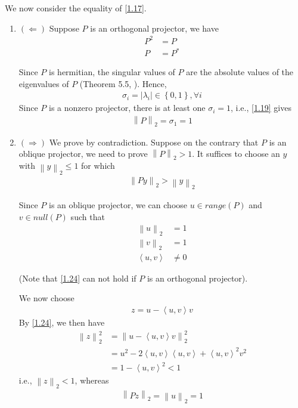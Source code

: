 \documentclass[a4paper,oneside]{book}
\numberwithin{equation}{chapter}
\begin{document}
We now consider the equality of \eqref{1.17}.
\begin{enumerate}
\item $\left(  \Leftarrow  \right)$ Suppose $P$ is an orthogonal projector, we have 
\begin{align}
{P^2} &= P\\
P &= {P^*}
\end{align}

Since $P$ is hermitian, the singular values of $P$ are the absolute values of the eigenvalues of $P$ (Theorem 5.5, \cite{1}). Hence, 
\begin{align}
\label{1.19}
{\sigma _i} = \left| {{\lambda _i}} \right| \in \left\{ {0,1} \right\},\forall i
\end{align}
Since $P$ is a nonzero projector, there is at least one $\sigma _i =1$, i.e., \eqref{1.19} gives
\begin{align}
{\left\| P \right\|_2} = {\sigma _1} = 1
\end{align}
\item $\left(  \Rightarrow  \right)$ We prove by contradiction. Suppose on the contrary that $P$ is an oblique projector, we need to prove ${\left\| P \right\|_2} > 1$. It suffices to choose an $y$ with ${\left\| y \right\|_2} \le 1$ for which 
\begin{align}
{\left\| {Py} \right\|_2} > {\left\| y \right\|_2}
\end{align}

Since $P$ is an oblique projector, we can choose $u \in range\left( P \right)$ and $v \in null\left( P \right)$ such that 
\begin{align}
{\left\| u \right\|_2} &= 1\\
{\left\| v \right\|_2} &= 1\\
\left\langle {u,v} \right\rangle  &\ne 0 \label{1.24}
\end{align}

(Note that \eqref{1.24} can not hold if $P$ is an orthogonal projector).

We now choose 
\begin{align}
z = u - \left\langle {u,v} \right\rangle v
\end{align}
By \eqref{1.24}, we then have
\begin{align}
\left\| z \right\|_2^2 &= \left\| {u - \left\langle {u,v} \right\rangle v} \right\|_2^2\\
 &= {u^2} - 2\left\langle {u,v} \right\rangle \left\langle {u,v} \right\rangle  + {\left\langle {u,v} \right\rangle ^2}{v^2}\\
& = 1 - {\left\langle {u,v} \right\rangle ^2} < 1
\end{align}
i.e., ${\left\| z \right\|_2} < 1$, whereas
\begin{align}
{\left\| {Pz} \right\|_2} = {\left\| u \right\|_2} = 1
\end{align}


\end{enumerate}
\end{document}
